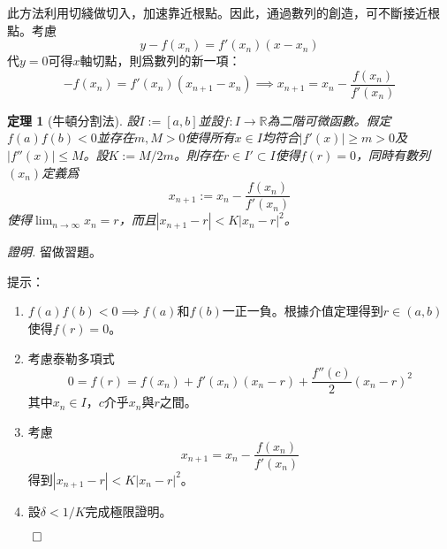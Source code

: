 \documentclass[12pt]{article}
\newtheorem*{theorem}{定理}
\renewenvironment*{proof}{\textit{證明.}}{\hfill$\qed$}
\begin{document}
    此方法利用切綫做切入，加速靠近根點。因此，通過數列的創造，可不斷接近根點。考慮$$y-f(x_n)=f'(x_n)(x-x_n)$$代$y=0$可得$x$軸切點，則爲數列的新一項：$$-f(x_n)=f'(x_n)(x_{n+1}-x_n) \implies x_{n+1}=x_n-\frac{f(x_n)}{f'(x_n)}$$

    \begin{theorem}[牛頓分割法]
        設$I:=[a,b]$並設$f:I\to\mathbb{R}$為二階可微函數。假定$f(a)f(b)<0$並存在$m,M>0$使得所有$x\in I$均符合$|f'(x)|\geq m>0$及$|f''(x)|\leq M$。設$K:=M/2m$。則存在$r\in I'\subset I$使得$f(r)=0$，同時有數列$(x_n)$定義爲$$x_{n+1}:=x_n-\frac{f(x_n)}{f'(x_n)}$$使得$\displaystyle\lim_{n\to \infty}x_n=r$，而且$|x_{n+1}-r|<K|x_n-r|^2$。
    \end{theorem}

    \begin{proof}
        留做習題。

        提示：\begin{enumerate}
            \item $f(a)f(b)<0\implies f(a)$和$f(b)$一正一負。根據介值定理得到$r\in(a,b)$使得$f(r)=0$。
            \item 考慮泰勒多項式$$0=f(r)=f(x_n)+f'(x_n)(x_n-r)+\frac{f''(c)}{2}(x_n-r)^2$$其中$x_n\in I$，$c$介乎$x_n$與$r$之間。
            \item 考慮$$x_{n+1}=x_n-\frac{f(x_n)}{f'(x_n)}$$得到$|x_{n+1}-r|<K|x_n-r|^2$。
            \item 設$\delta<1/K$完成極限證明。
        \end{enumerate}
    \end{proof}
\end{document}
